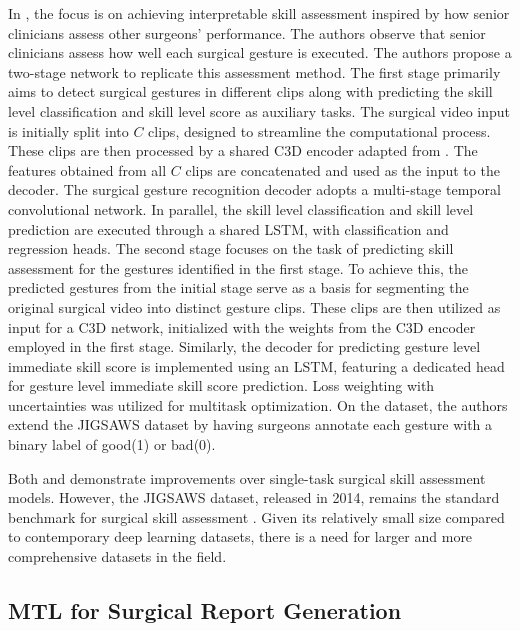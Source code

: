 In \citet{accurate_skill_assessment_gesture}, the focus is on achieving interpretable skill assessment inspired by how senior clinicians assess other surgeons' performance. The authors observe that senior clinicians assess how well each surgical gesture is executed. The authors propose a two-stage network to replicate this assessment method.
The first stage primarily aims to detect surgical gestures in different clips along with predicting the skill level classification and skill level score as auxiliary tasks. The surgical video input is initially split into $C$ clips, designed to streamline the computational process. These clips are then processed by a shared C3D encoder adapted from \citet{tran2015learning}. The features obtained from all $C$ clips are concatenated and used as the input to the decoder.
The surgical gesture recognition decoder adopts a multi-stage temporal convolutional network. In parallel, the skill level classification and skill level prediction are executed through a shared LSTM, with classification and regression heads.
The second stage focuses on the task of predicting skill assessment for the gestures identified in the first stage. To achieve this, the predicted gestures from the initial stage serve as a basis for segmenting the original surgical video into distinct gesture clips. These clips are then utilized as input for a C3D network, initialized with the weights from the C3D encoder employed in the first stage. Similarly, the decoder for predicting gesture level immediate skill score is implemented using an LSTM, featuring a dedicated head for gesture level immediate skill score prediction. Loss weighting with uncertainties \citet{uncertainty_weighting} was utilized for multitask optimization. On the dataset, the authors extend the JIGSAWS dataset by having surgeons annotate each gesture with a binary label of good(1) or bad(0). 

Both \citet{accurate_skill_assessment_gesture} and \citet{jian2020multitask} demonstrate improvements over single-task surgical skill assessment models. However, the JIGSAWS dataset, released in 2014, remains the standard benchmark for surgical skill assessment \cite{lam2022machine}. Given its relatively small size compared to contemporary deep learning datasets, there is a need for larger and more comprehensive datasets in the field.

\subsection{MTL for Surgical Report Generation} \label{sec::report_generation}

